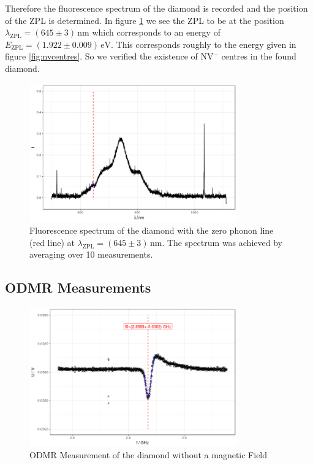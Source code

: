 Therefore the fluorescence spectrum of the diamond is recorded and the position of the ZPL is determined. In figure \ref{fig:fluorescence} we see the ZPL to be at the position $\lambda_\text{ZPL}=(645\pm3)\,\mathrm{nm}$ which corresponds to an energy of $E_\text{ZPL}=(1.922\pm0.009)\,\mathrm{eV}$. This corresponds roughly to the energy given in figure \ref{fig:nvcentres}. So we verified the existence of NV$^-$ centres in the found diamond.
\begin{figure}
	\centering
	\includegraphics[width=0.8\textwidth]{../figures/fluorescence.png}
	\caption[Fluorescence spectrum of the diamond]{Fluorescence spectrum of the diamond with the zero phonon line (red line) at $\lambda_\text{ZPL}=(645\pm3)\,\mathrm{nm}$. The spectrum was achieved by averaging over 10 measurements.}
	\label{fig:fluorescence}
\end{figure}

\subsection{ODMR Measurements}
\begin{figure}
	\centering
	\includegraphics[width=0.8\textwidth]{../figures/odmr-1.png}
	\caption{ODMR Measurement of the diamond without a magnetic Field}
	\label{fig:odmr-no-B}
\end{figure}


